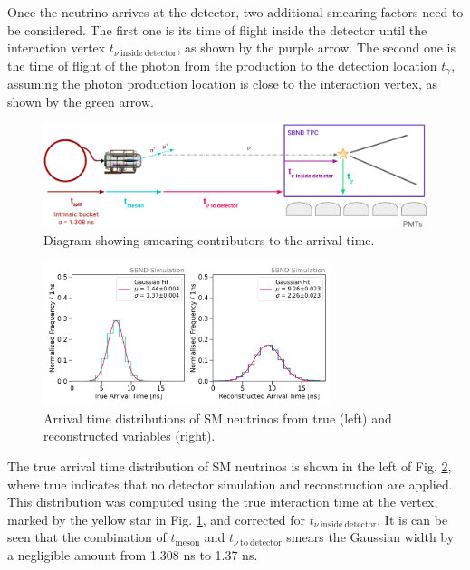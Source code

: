 Once the neutrino arrives at the detector, two additional smearing factors need to be considered.
The first one is its time of flight inside the detector until the interaction vertex $t_{\nu\ \mathrm{inside\ detector}}$, as shown by the purple arrow.
The second one is the time of flight of the photon from the production to the detection location $t_{\gamma}$, assuming the photon production location is close to the interaction vertex, as shown by the green arrow.

\begin{figure}[h!]
    \centering
    \includegraphics[width=1.0\textwidth]{smearing_factors.png}
    \caption[Smearing Contributors to the Arrival Time]{Diagram showing smearing contributors to the arrival time.}
    \label{fig:smearing_factors}
\end{figure}

\begin{figure}[b!]
    \centering
    \includegraphics[width=0.75\textwidth]{truth_reco_gaus.png}
    \caption[Arrival Time of SM Neutrinos from True and Reconstructed Variables]{
    Arrival time distributions of SM neutrinos from true (left) and reconstructed variables (right).
    }
    \label{fig:gaus_truth_reco}
\end{figure}

The true arrival time distribution of SM neutrinos is shown in the left of Fig. \ref{fig:gaus_truth_reco}, where true indicates that no detector simulation and reconstruction are applied.
This distribution was computed using the true interaction time at the vertex, marked by the yellow star in Fig. \ref{fig:smearing_factors}, and corrected for $t_{\nu\ \mathrm{inside\ detector}}$.
It is can be seen that the combination of $t_{\mathrm{meson}}$ and $t_{\nu\ \mathrm{to\ detector}}$ smears the Gaussian width by a negligible amount from 1.308 ns to 1.37 ns.

